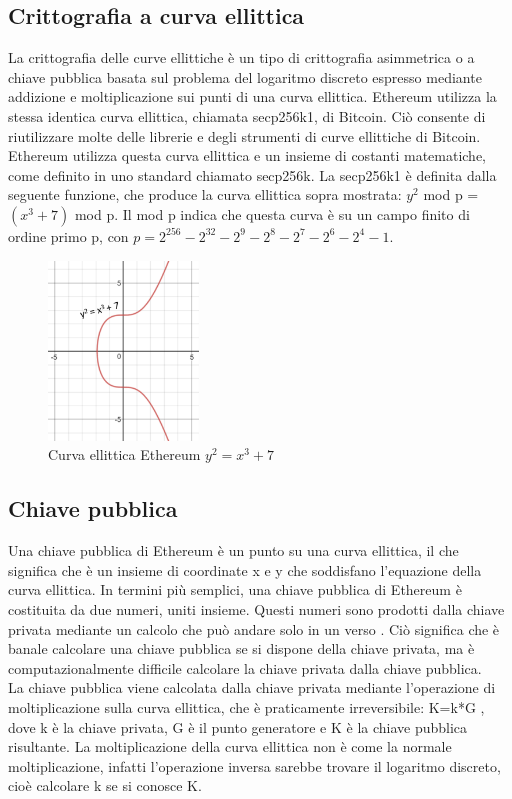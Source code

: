 \documentclass[a4paper,11pt]{report}
\begin{document}
\subsection{Crittografia a curva ellittica}
La crittografia delle curve ellittiche è un tipo di crittografia asimmetrica o a chiave pubblica basata sul problema del logaritmo discreto espresso mediante addizione e moltiplicazione sui punti di una curva ellittica.
Ethereum utilizza la stessa identica curva ellittica, chiamata secp256k1, di Bitcoin. Ciò consente di riutilizzare molte delle librerie e degli strumenti di curve ellittiche di Bitcoin.\\
Ethereum utilizza questa curva ellittica e un insieme di costanti matematiche, come definito in uno standard chiamato secp256k. La secp256k1 è definita dalla seguente funzione, che produce la curva ellittica sopra mostrata: $y^{2}$ mod p = $(x^{3} +7)$  mod p. Il mod p indica che questa curva è su un campo finito di ordine primo p, con $p=2^{256}-2^{32}-2^{9}-2^{8}-2^{7}-2^{6}-2^{4}-1$. \\
\begin{figure}[htbp] 
\begin{center}
\includegraphics[width=4cm]{img/elliptic-curve.png} 
\end{center}
\caption{Curva ellittica Ethereum $y^{2}=x^{3}+7$}
\end{figure}

\newpage
\subsection{Chiave pubblica}
Una chiave pubblica di Ethereum è un punto su una curva ellittica, il che significa che è un insieme di coordinate x e y che soddisfano l'equazione della curva ellittica.
In termini più semplici, una chiave pubblica di Ethereum è costituita da due numeri, uniti insieme. Questi numeri sono prodotti dalla chiave privata mediante un calcolo che può andare solo in un verso . Ciò significa che è banale calcolare una chiave pubblica se si dispone della chiave privata, ma è computazionalmente difficile calcolare la chiave privata dalla chiave pubblica.\\
La chiave pubblica viene calcolata dalla chiave privata mediante l'operazione di  moltiplicazione sulla curva ellittica, che è praticamente irreversibile: K=k*G , dove k è la chiave privata, G è il punto generatore e K è la chiave pubblica risultante.
La moltiplicazione della curva ellittica non è come la normale moltiplicazione, infatti l'operazione inversa sarebbe trovare il logaritmo discreto, cioè calcolare k se si conosce K.\\
\end{document}
